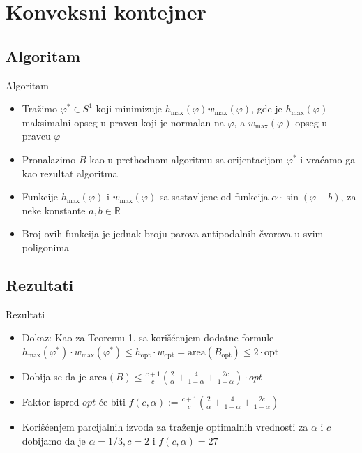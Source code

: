 \documentclass{beamer}
\theoremstyle{plain}
\newcommand{\thistheoremname}{}
\newtheorem{genericthm}[thm]{\thistheoremname}
\newenvironment{namedthm}[1]
  {\renewcommand{\thistheoremname}{#1}%
   \begin{genericthm}}
  {\end{genericthm}}
\begin{document}
\section{Konveksni kontejner}
\subsection{Algoritam}
\begin{frame}{Algoritam}
\begin{itemize}
    \item Tražimo $\varphi^* \in S^1$ koji minimizuje $h_{\text{max}}(\varphi)w_{\text{max}}(\varphi)$, gde je $h_{\text{max}}(\varphi)$ maksimalni opseg u pravcu koji je normalan na $\varphi$, a $w_{\text{max}}(\varphi)$ opseg u pravcu $\varphi$
    \item Pronalazimo $B$ kao u prethodnom algoritmu sa orijentacijom $\varphi^*$ i vraćamo ga kao rezultat algoritma
    \item Funkcije $h_{\text{max}}(\varphi)$ i $w_{\text{max}}(\varphi)$ sa sastavljene od funkcija $\alpha \cdot \sin{(\varphi+b)}$, za neke konstante $a, b \in \mathbb{R}$
    \item Broj ovih funkcija je jednak broju parova antipodalnih čvorova u svim poligonima
\end{itemize}
\end{frame}

\subsection{Rezultati}
\begin{frame}{Rezultati}
\begin{itemize}
    \begin{namedthm}{Teorema 2.}
        Neka je $P$ skup konveksnih poligona na ravni sa ukupno n temena. Možemo spakovati $P$ u vremenu $O(nlogn)$ u konveksni poligon $B$ takav da je $\text{area}(B) \leq 27 \cdot opt$, gde je $opt$ minimalna površina bilo kog pravougaonog kontejnera za $P$
    \end{namedthm}
    \item Dokaz: Kao za Teoremu 1. sa korišćenjem dodatne formule $h_{\text{max}}(\varphi^*) \cdot w_{\text{max}}(\varphi^*) \leq h_{\text{opt}} \cdot w_{\text{opt}} = \text{area}(B_{\text{opt}}) \leq 2 \cdot \text{opt}$
    \item Dobija se da je $\text{area}(B) \leq \frac{c+1}{c}(\frac{2}{\alpha}+\frac{4}{1-\alpha}+\frac{2c}{1-\alpha}) \cdot opt$
    \item Faktor ispred $opt$ će biti $f(c,\alpha) := \frac{c+1}{c}(\frac{2}{\alpha}+\frac{4}{1-\alpha}+\frac{2c}{1-\alpha})$
    \item Korišćenjem parcijalnih izvoda za traženje optimalnih vrednosti za $\alpha$ i $c$ dobijamo da je $\alpha=1/3,c=2$ i $f(c,\alpha)=27$
\end{itemize}
\end{frame}
\end{document}
